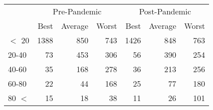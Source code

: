 
\begin{tabular}[t]{lrrrrrr}
\toprule
\multicolumn{1}{c}{ } & \multicolumn{3}{c}{Pre-Pandemic} & \multicolumn{3}{c}{Post-Pandemic} \\
\cmidrule(l{3pt}r{3pt}){2-4} \cmidrule(l{3pt}r{3pt}){5-7}
 & Best & Average & Worst & Best & Average & Worst\\
\midrule
$<$ 20 & 1388 & 850 & 743 & 1426 & 848 & 763\\
20-40 & 73 & 453 & 306 & 56 & 390 & 254\\
40-60 & 35 & 168 & 278 & 36 & 213 & 256\\
60-80 & 22 & 44 & 168 & 25 & 77 & 180\\
80 $<$ & 15 & 18 & 38 & 11 & 26 & 101\\
\bottomrule
\end{tabular}
